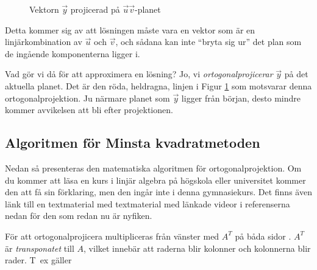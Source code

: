 \documentclass[titlepage, 10pt]{article}
\begin{document}
\begin{figure}[H] %
  \centering %
  \caption{Vektorn $\vec{y}$ projicerad på $\vec{u}\vec{v}$-planet}
  \label{fig:ortogonalprojektion}
\end{figure}

Detta kommer sig av att lösningen måste vara en vektor som är en
linjärkombination av $\vec{u}$ och $\vec{v}$, och sådana kan inte ``bryta sig
ur'' det plan som de ingående komponenterna ligger i.

Vad gör vi då för att approximera en lösning? Jo, vi \emph{ortogonalprojicerar}
$\vec{y}$ på det aktuella planet. Det är den röda, heldragna, linjen i Figur
\ref{fig:ortogonalprojektion} som motsvarar denna ortogonalprojektion. Ju
närmare planet som $\vec{y}$ ligger från början, desto mindre kommer avvikelsen
att bli efter projektionen.

\subsection{Algoritmen för Minsta kvadratmetoden}
Nedan så presenteras den matematiska algoritmen för ortogonalprojektion.
Om du kommer att läsa en kurs i linjär algebra på högskola eller universitet
kommer den att få sin förklaring, men den ingår inte i denna gymnasiekurs.
Det finns även länk till en textmaterial med textmaterial med länkade videor i
referenserna nedan för den som redan nu är nyfiken.

För att ortogonalprojicera multipliceras från vänster med $A^T$ på båda sidor
\cite[p.~85]{MatrixAlgebraForEngineers:1}.
$A^T$ är \emph{trans\-ponatet} till $A$, vilket innebär att raderna blir
kolonner och kolonnerna blir rader. \mbox{T ex} gäller
\end{document}
